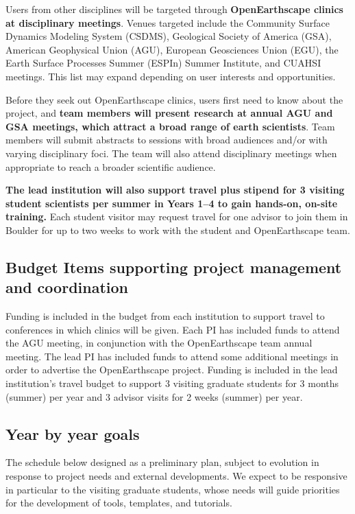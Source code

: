 Users from other disciplines will be targeted through \textbf{OpenEarthscape clinics at disciplinary meetings}. Venues targeted include the Community Surface Dynamics Modeling System (CSDMS), Geological Society of America (GSA), American Geophysical Union (AGU), European Geosciences Union (EGU), the Earth Surface Processes Summer (ESPIn) Summer Institute, and CUAHSI meetings. This list may expand depending on user interests and opportunities.
 
Before they seek out OpenEarthscape clinics, users first need to know about the project, and \textbf{team members will present research at annual AGU and GSA meetings, which attract a broad range of earth scientists}.  Team members will submit abstracts to sessions with broad audiences and/or with varying disciplinary foci.  The team will also attend disciplinary meetings when appropriate to reach a broader scientific audience.

\textbf{The lead institution will also support travel plus stipend for 3 visiting student scientists per summer in Years 1--4 to gain hands-on, on-site training.} Each student visitor may request travel for one advisor to join them in Boulder for up to two weeks to work with the student and OpenEarthscape team. %

\subsection*{Budget Items supporting project management and coordination}
 
Funding is included in the budget from each institution to support travel to conferences in which clinics will be given. Each PI has included funds to attend the AGU meeting, in conjunction with the OpenEarthscape team annual meeting.
 The lead PI has included funds to attend some additional meetings in order to advertise the OpenEarthscape project.
 Funding is included in the lead institution's travel budget to support 3 visiting graduate students for 3 months (summer) per year and 3 advisor visits for 2 weeks (summer) per year.

\subsection*{Year by year goals}

The schedule below designed as a preliminary plan, subject to evolution in response to project needs and external developments. We expect to be responsive in particular to the visiting graduate students, whose needs will guide priorities for the development of tools, templates, and tutorials.

